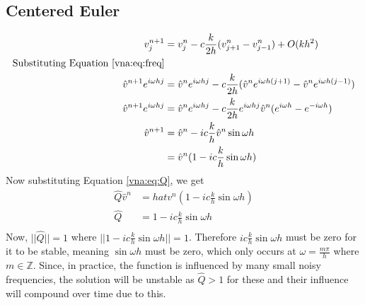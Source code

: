 \subsection{Centered Euler}
\begin{equation*}
\begin{aligned}
    v_j^{n+1}	&= v_j^n - c\frac{k}{2h}(v_{j+1}^n - v_{j-1}^n) + O(kh^2)	\\
    \text{Substituting Equation \ref{vna:eq:freq}} 				\\
    \hat{v}^{n+1}e^{i\omega hj} &= \hat{v}^ne^{i\omega hj} - c\frac{k}{2h} (\hat{v}^ne^{i\omega h(j+1)} - \hat{v}^ne^{i\omega h(j-1)})						    \\
    \hat{v}^{n+1}e^{i\omega hj} &= \hat{v}^ne^{i\omega hj} - c\frac{k}{2h} e^{i\omega hj} \hat{v}^n (e^{i\omega h} - e^{-i\omega h})							    \\
    \hat{v}^{n+1} &= \hat{v}^n - ic\frac{k}{h} \hat{v}^n \sin{\omega h}		\\
		  &= \hat{v}^n(1 - ic\frac{k}{h} \sin{\omega h})
\end{aligned}
\end{equation*}
Now substituting Equation \ref{vna:eq:Q}, we get
\begin{equation*}
\begin{aligned}
    \hat{Q}\hat{v}^n &= hat{v}^n(1 - ic\frac{k}{h} \sin{\omega h})	\\
    \hat{Q} &= 1 - ic\frac{k}{h} \sin{\omega h}				\\
\end{aligned}
\end{equation*}
Now, $||\hat{Q}|| = 1$ where $||1 - ic\frac{k}{h} \sin{\omega h}|| = 1$. Therefore $ic\frac{k}{h} \sin{\omega h}$ must be zero for it to be stable, meaning $\sin{\omega h}$ must be zero, which only occurs at $\omega=\frac{m\pi}{h}$ where $m \in \mathbb{Z}$. Since, in practice, the function is influenced by many small noisy frequencies, the solution will be unstable as $\hat{Q}>1$ for these and their influence will compound over time due to this.
